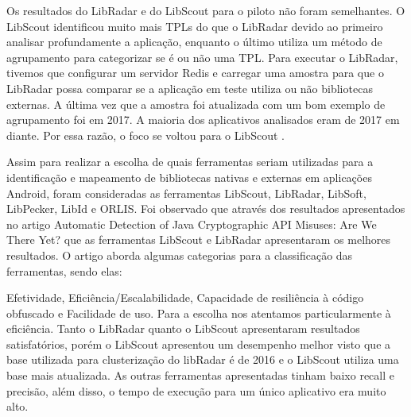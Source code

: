 Os resultados do LibRadar e do LibScout para o piloto não foram semelhantes. O LibScout identificou muito mais TPLs do que o LibRadar devido ao primeiro analisar profundamente a aplicação, enquanto o último utiliza um método de agrupamento para categorizar se é ou não uma TPL. Para executar o LibRadar, tivemos que configurar um servidor Redis e carregar uma amostra para que o LibRadar possa comparar se a aplicação em teste utiliza ou não bibliotecas externas. A última vez que a amostra foi atualizada com um bom exemplo de agrupamento foi em 2017. A maioria dos aplicativos analisados eram de 2017 em diante. Por essa razão, o foco se voltou para o LibScout \cite{api_tpl_zhang}.



Assim para realizar a escolha de quais ferramentas seriam utilizadas para a identificação e mapeamento de bibliotecas nativas e externas em aplicações Android, foram consideradas as ferramentas LibScout, LibRadar, LibSoft, LibPecker, LibId e ORLIS. Foi observado que através dos resultados apresentados no artigo Automatic Detection of Java Cryptographic API Misuses: Are We There Yet? que as ferramentas LibScout e LibRadar apresentaram os melhores resultados. O artigo aborda algumas categorias para a classificação das ferramentas, sendo elas:

Efetividade, Eficiência/Escalabilidade, Capacidade de resiliência à código obfuscado e Facilidade de uso. Para a escolha nos atentamos particularmente à eficiência. Tanto o LibRadar quanto o LibScout apresentaram resultados satisfatórios, porém o LibScout apresentou um desempenho melhor visto que a base utilizada para clusterização do libRadar é de 2016 e o LibScout utiliza uma base mais atualizada. As outras ferramentas apresentadas tinham baixo recall e precisão, além disso, o tempo de execução para um único aplicativo era muito alto.

